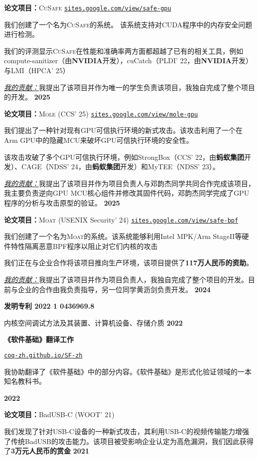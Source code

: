 \documentclass{resume}
\begin{document}
\begin{content}
	\textbf{论文项目：}\textsc{CuSafe} \enspace
	{\href{https://sites.google.com/view/safe-gpu/}{\texttt{sites.google.com/view/safe-gpu}}}

	{我们创建了一个名为\textsc{CuSafe}的系统。 该系统支持对CUDA程序中的内存安全问题进行检测。}

	{我们的评测显示\textsc{CuSafe}在性能和准确率两方面都超越了已有的相关工具，例如compute-sanitizer（由\textbf{NVIDIA}开发），cuCatch（PLDI’ 22，由\textbf{NVIDIA}开发）与LMI（HPCA’ 25）}

  {\underline{\textit{我的贡献：}}我提出了该项目并作为唯一的学生负责该项目，我独自完成了整个项目的开发。}
	\hfill {\bf 2025}


	\textbf{论文项目：}\textsc{Mole} (CCS' 25) \enspace
	{\href{https://sites.google.com/view/mole-gpu}{\texttt{sites.google.com/view/mole-gpu}}}

	{我们提出了一种针对现有GPU可信执行环境的新式攻击。该攻击利用了一个在Arm GPU中的隐藏MCU来破坏GPU可信执行环境的安全性。}

	{该攻击攻破了多个GPU可信执行环境，例如StrongBox（CCS’ 22，由\textbf{蚂蚁集团}开发）、CAGE（NDSS’ 24，由\textbf{蚂蚁集团}开发）和MyTEE（NDSS’ 23）。}

  {\underline{\textit{我的贡献：}}我提出了该项目并作为项目负责人与邓韵杰同学共同合作完成该项目，我主要负责逆向GPU MCU核心组件并修改其固件代码，邓韵杰同学完成了GPU程序的分析与攻击原型的验证。}
	\hfill{\bf 2025}


	\textbf{论文项目：}\textsc{Moat} (USENIX Security' 24) \enspace
	{\href{https://sites.google.com/view/safe-bpf/}{\texttt{sites.google.com/view/safe-bpf}}}

	{我们创建了一个名为\textsc{Moat}的系统。该系统能够利用Intel MPK/Arm StageII等硬件特性隔离恶意BPF程序以阻止对它们内核的攻击}

	{我们正在与企业合作将该项目推向生产环境，该项目提供了\textbf{117万人民币的资助}。}

  {\underline{\textit{我的贡献：}}我提出了该项目并作为项目负责人，我独自完成了整个项目的开发。目前与企业的合作由我负责指导，另一位同学黄沥剑负责开发。}
	\hfill {\bf 2024}

	\textbf{发明专利 2022 1 0436969.8}

	{内核空间调试方法及其装置、计算机设备、存储介质}
	\hfill {\bf 2022}

	\textbf{《软件基础》翻译工作} \enspace
	{\href{https://coq-zh.github.io/SF-zh/}{\texttt{coq-zh.github.io/SF-zh}}

		{我协助翻译了《软件基础》中的部分内容。《软件基础》是形式化验证领域的一本知名教科书。}}
	\hfill {\bf 2022}

	\textbf{论文项目：}BadUSB-C (WOOT' 21)

	{我们发现了针对USB-C设备的一种新式攻击，其利用USB-C的视频传输能力增强了传统BadUSB的攻击能力。该项目被受影响企业认定为高危漏洞，我们因此获得了\textbf{3万元人民币的赏金}}
	\hfill {\bf 2021}


	\sectionlineskip
\end{content}
\end{document}
